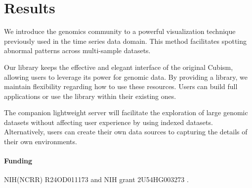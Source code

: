 \documentclass{bioinfo}
\begin{document}
\section{Results}

We introduce the genomics community to a powerful visualization technique
previously used in the time series data domain. This method facilitates
spotting abnormal patterns across multi-sample datasets.

Our library keeps the effective and elegant interface of the original Cubism,
allowing users to leverage its power for genomic data. By providing a
library, we maintain flexibility regarding how to use these resources. Users
can build full applications or use the library within their existing ones.

The companion lightweight server will facilitate the exploration of large
genomic datasets without affecting user experience by using indexed datasets.
Alternatively, users can create their own data sources to capturing the details
of their own environments.




\paragraph{Funding\textcolon} NIH(NCRR) R24OD011173 and NIH grant 2U54HG003273 .


\end{document}
